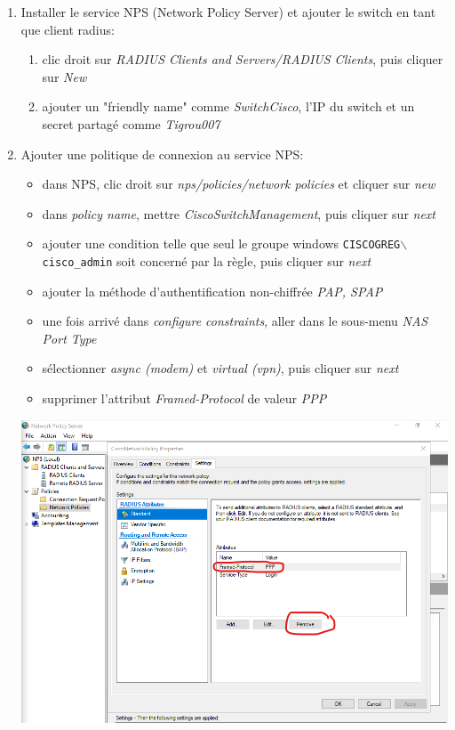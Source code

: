 \documentclass[a4paper]{article}
\begin{document}
\begin{enumerate}
\item Installer le service NPS (Network Policy Server) et ajouter le switch en tant que client radius:
\begin{enumerate}
    \item clic droit sur \textit{RADIUS Clients and Servers/RADIUS Clients}, puis cliquer sur \textit{New}
    \item ajouter un "friendly name" comme \textit{SwitchCisco}, l'IP du switch et un secret partagé comme \textit{Tigrou007}
\end{enumerate}

\item Ajouter une politique de connexion au service NPS:
\begin{itemize}
    \item dans NPS, clic droit sur \textit{nps/policies/network policies} et cliquer sur \textit{new}
    \item dans \textit{policy name}, mettre \textit{CiscoSwitchManagement}, puis cliquer sur \textit{next}
    \item ajouter une condition telle que seul le groupe windows \texttt{CISCOGREG$\backslash$cisco\_admin} soit concerné par la règle, puis cliquer sur \textit{next}
    \item ajouter la méthode d'authentification non-chiffrée \textit{PAP, SPAP}
    \item une fois arrivé dans \textit{configure constraints}, aller dans le sous-menu \textit{NAS Port Type}
    \item sélectionner \textit{async (modem)} et \textit{virtual (vpn)}, puis cliquer sur \textit{next}
    \item supprimer l'attribut \textit{Framed-Protocol} de valeur \textit{PPP}
\end{itemize}
\begin{center} \includegraphics[width=0.90\linewidth]{images/remove-ppp.png} \end{center}


\end{enumerate}
\end{document}
